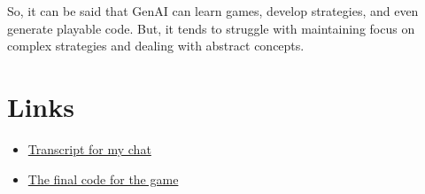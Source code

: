 \documentclass{article}
\begin{document}
So, it can be said that GenAI can learn games, develop strategies, and even generate playable code. But, it tends to struggle with maintaining focus on complex strategies and dealing with abstract concepts. 

\newpage

\section{Links}
    \begin{itemize}
    \color{blue}
        \item \href{https://chat.openai.com/share/dee4d319-f2da-48be-8f3f-cdcc8f603116}{Transcript for my chat}
    
        \item \href{https://colab.research.google.com/drive/13c1AyFl__FLPmxBiya7yxov_iHZq7-l7?usp=sharing}{The final code for the game}
    \end{itemize}
\end{document}
